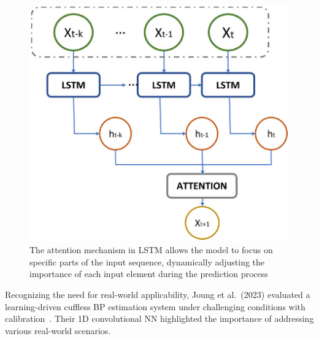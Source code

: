 \begin{figure}
    \begin{minipage}[c]{0.5\textwidth}
        \includegraphics[width=\textwidth]{images/ml/attention}
    \end{minipage}\hfill
    \begin{minipage}[c]{0.5\textwidth}
        \caption{The attention mechanism in LSTM allows the model to focus on specific parts of the input sequence, dynamically adjusting the importance of each input element during the prediction process~\cite{marulandaHybridModelBased2023}}
        \label{fig:attention}
    \end{minipage}
\end{figure}


Recognizing the need for real-world applicability, Joung et al.\ (2023) evaluated a learning-driven cuffless BP estimation system under challenging conditions with calibration~\cite{joungContinuousCufflessBlood2023}.
Their 1D convolutional NN highlighted the importance of addressing various real-world scenarios.

